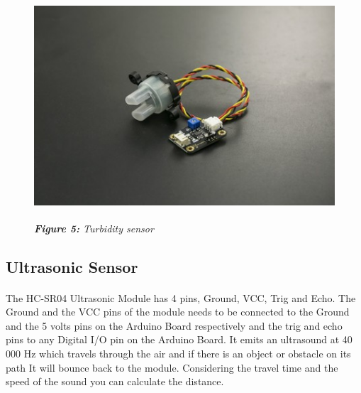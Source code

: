 \documentclass[12pt]{article}
\begin{document}
\begin{figure}
\includegraphics[scale=0.4,width=6in,height=3in]{turbidity.jpg}   %
\begin{center}
\textit{\textbf{Figure 5:}  Turbidity sensor}  %
\end{center}
\end{figure}
\newpage
\subsection*{Ultrasonic Sensor}
\paragraph*{}
The HC-SR04 Ultrasonic Module has 4 pins, Ground, VCC, Trig and Echo. The Ground and the VCC pins of the module needs to be connected to the Ground and the 5 volts pins on the Arduino Board respectively and the trig and echo pins to any Digital I/O pin on the Arduino Board. It emits an ultrasound at 40 000 Hz which travels through the air and if there is an object or obstacle on its path It will bounce back to the module. Considering the travel time and the speed of the sound you can calculate the distance.
\end{document}
